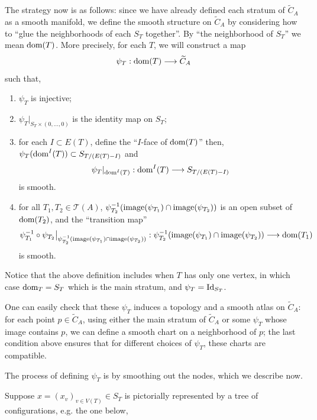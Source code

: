 \documentclass[11pt]{article}
\theoremstyle{definition}
\theoremstyle{remark}
\def\wt#1{\widetilde{#1}}
\def\cT{\mathcal{T}}
\def\dom{{\tn{dom}}}
\def\tn#1{\textnormal{#1}}
\begin{document}
The strategy now is as follows: since we have already defined each stratum of $\wt{C}_A$ as a smooth manifold, we define the smooth structure on $\wt{C}_A$ by considering how to ``glue the neighborhoods of each $S_T$ together''. 
By ``the neighborhood of $S_T$'' we mean $\dom(T)$. 
More precisely, for each $T$, we will construct a map 
$$\psi_T:\dom(T)\longrightarrow \widetilde{C}_A$$
such that, 
\begin{enumerate}
\item \label{psi1_item} $\psi_T$ is injective;

\item \label{psi2_item} $\psi_T|_{S_T\times(0,\ldots,0)}$ is the identity map on $S_T$; 

\item \label{psi3_item} for each $I\subset E(T)$, define the ``$I$-face of $\dom(T)$''
then, 
$\psi_T(\dom^I(T))\subset S_{T/(E(T)-I)}$
and 
$$\psi_T|_{\dom^I(T)}:\dom^I(T)\longrightarrow S_{T/(E(T)-I)}$$
is smooth. 

\item \label{psi4_item} for all $T_1,T_2\in\cT(A)$, $\psi_{T_2}^{-1}(\tn{image}(\psi_{T_1})\cap\tn{image}(\psi_{T_2}))$ is an open subset of $\dom(T_2)$, and the ``transition map'' 
$$\psi_{T_1}^{-1}\circ\psi_{T_2}\big|_{\psi_{T_2}^{-1}(\tn{image}(\psi_{T_1})\cap\tn{image}(\psi_{T_2}))}:\psi_{T_2}^{-1}(\tn{image}(\psi_{T_1})\cap\tn{image}(\psi_{T_2}))\longrightarrow \dom(T_1)$$
is smooth. 
\end{enumerate}

Notice that the above definition includes when $T$ has only one vertex, in which case $\dom_T=S_T$ which is the main stratum, and $\psi_T=\tn{Id}_{S_T}$. 
  
One can easily check that these $\psi_T$ induces a topology and a smooth atlas on $\wt{C}_A$: for each point $p\in\wt{C}_A$, using either the main stratum of $\wt{C}_A$ or some $\psi_T$ whose image contains $p$, we can define a smooth chart on a neighborhood of $p$; the last condition above ensures that for different choices of $\psi_T$, these charts are compatible. 

The process of defining $\psi_T$ is by smoothing out the nodes, which we describe now. 

Suppose $x=(x_v)_{v\in V(T)}\in S_T$ is pictorially represented by a tree of configurations, e.g. the one below, 
\end{document}

